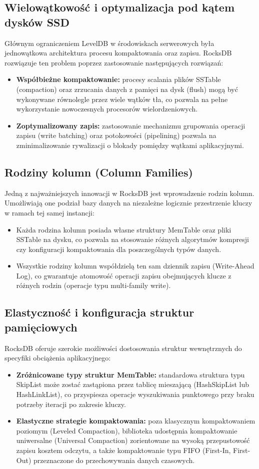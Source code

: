\subsection{Wielowątkowość i optymalizacja pod kątem dysków SSD}
Głównym ograniczeniem LevelDB w środowiskach serwerowych była jednowątkowa architektura procesu kompaktowania oraz zapisu. RocksDB rozwiązuje ten problem poprzez zastosowanie następujących rozwiązań:
\begin{itemize}
    \item \textbf{Współbieżne kompaktowanie:} procesy scalania plików SSTable (compaction) oraz zrzucania danych z pamięci na dysk (flush) mogą być wykonywane równolegle przez wiele wątków tła, co pozwala na pełne wykorzystanie nowoczesnych procesorów wielordzeniowych.
    \item \textbf{Zoptymalizowany zapis:} zastosowanie mechanizmu grupowania operacji zapisu (write batching) oraz potokowości (pipelining) pozwala na zminimalizowanie rywalizacji o blokady pomiędzy wątkami aplikacyjnymi.
\end{itemize}

\subsection{Rodziny kolumn (Column Families)}
Jedną z najważniejszych innowacji w RocksDB jest wprowadzenie rodzin kolumn. Umożliwiają one podział bazy danych na niezależne logicznie przestrzenie kluczy w ramach tej samej instancji:
\begin{itemize}
    \item Każda rodzina kolumn posiada własne struktury MemTable oraz pliki SSTable na dysku, co pozwala na stosowanie różnych algorytmów kompresji czy konfiguracji kompaktowania dla poszczególnych typów danych.
    \item Wszystkie rodziny kolumn współdzielą ten sam dziennik zapisu (Write-Ahead Log), co gwarantuje atomowość operacji zapisu obejmujących klucze z różnych rodzin (operacje typu multi-family write).
\end{itemize}

\subsection{Elastyczność i konfiguracja struktur pamięciowych}
RocksDB oferuje szerokie możliwości dostosowania struktur wewnętrznych do specyfiki obciążenia aplikacyjnego:
\begin{itemize}
    \item \textbf{Zróżnicowane typy struktur MemTable:} standardowa struktura typu SkipList może zostać zastąpiona przez tablicę mieszającą (HashSkipList lub HashLinkList), co przyspiesza operacje wyszukiwania punktowego przy braku potrzeby iteracji po zakresie kluczy.
    \item \textbf{Elastyczne strategie kompaktowania:} poza klasycznym kompaktowaniem poziomym (Leveled Compaction), biblioteka udostępnia kompaktowanie uniwersalne (Universal Compaction) zorientowane na wysoką przepustowość zapisu kosztem odczytu, a także kompaktowanie typu FIFO (First-In, First-Out) przeznaczone do przechowywania danych czasowych.
\end{itemize}

